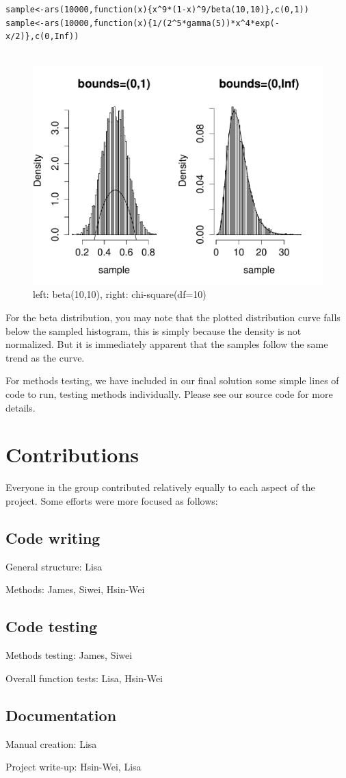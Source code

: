 \documentclass[11pt, oneside]{article}   	%
\begin{document}
\begin{lstlisting}[frame=single]
sample<-ars(10000,function(x){x^9*(1-x)^9/beta(10,10)},c(0,1))
sample<-ars(10000,function(x){1/(2^5*gamma(5))*x^4*exp(-x/2)},c(0,Inf))


\end{lstlisting}
\clearpage
\begin{figure}[htbp!]
 \centering
\caption{left: beta(10,10), right: chi-square(df=10)}
  \includegraphics[width=1.0\textwidth]{betachi}
\end{figure}

For the beta distribution, you may note that the plotted distribution curve falls below the sampled histogram, this is simply because the density is not normalized.  But it is immediately apparent that the samples follow the same trend as the curve.  

For methods testing, we have included in our final solution some simple lines of code to run, testing methods individually.  Please see our source code for more details.  


\section{Contributions}

Everyone in the group contributed relatively equally to each aspect of the project.  Some efforts were more focused as follows:

\subsection*{Code writing}

General structure: Lisa

Methods: James, Siwei, Hsin-Wei

\subsection*{Code testing}

Methods testing: James, Siwei

Overall function tests: Lisa, Hsin-Wei

\subsection*{Documentation} 

Manual creation: Lisa

Project write-up:  Hsin-Wei, Lisa
\end{document}
